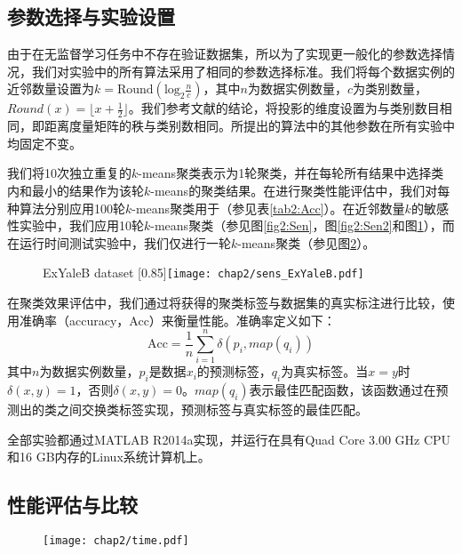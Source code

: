 \subsection{参数选择与实验设置}
由于在无监督学习任务中不存在验证数据集，所以为了实现更一般化的参数选择情况，我们对实验中的所有算法采用了相同的参数选择标准。我们将每个数据实例的近邻数量设置为$k = \mathrm{Round}(\mathrm{log}_2\frac{n}{c})$，其中$n$为数据实例数量，$c$为类别数量，$Round(x)=\lfloor x+\frac{1}{2}\rfloor$。我们参考文献\parencite{ng2002spectral}的结论，将投影的维度设置为与类别数目相同，即距离度量矩阵的秩与类别数相同。所提出的算法中的其他参数在所有实验中均固定不变。

我们将10次独立重复的$k$-means聚类表示为1轮聚类，并在每轮所有结果中选择类内和最小的结果作为该轮$k$-means的聚类结果。在进行聚类性能评估中，我们对每种算法分别应用100轮$k$-means聚类用于（参见表\ref{tab2:Acc}）。在近邻数量$k$的敏感性实验中，我们应用10轮$k$-means聚类（参见图\ref{fig2:Sen}，图\ref{fig2:Sen2}和图\ref{fig2:Sen3}），而在运行时间测试实验中，我们仅进行一轮$k$-means聚类（参见图\ref{fig2:Time}）。


\begin{figure}[t]
	\centering
					{ExYaleB dataset}
					[0.85\textwidth]{\texttt{[image: chap2/sens\_ExYaleB.pdf]}}
	\label{fig2:Sen3}
\end{figure} 
在聚类效果评估中，我们通过将获得的聚类标签与数据集的真实标注进行比较，使用准确率（accuracy，Acc）来衡量性能。准确率定义如下：
\begin{equation}
	\mathrm{Acc} = \frac{1}{n}\sum^{n}_{i=1}\delta(p_i, map(q_i))
\end{equation}
其中$n$为数据实例数量，$p_i$是数据$x_i$的预测标签，$q_i$为真实标签。当$x=y$时$\delta(x, y) = 1$，否则$\delta(x,y) = 0$。$map(q_i)$表示最佳匹配函数，该函数通过在预测出的类之间交换类标签实现，预测标签与真实标签的最佳匹配。

全部实验都通过MATLAB R2014a实现，并运行在具有Quad Core 3.00 GHz CPU和16 GB内存的Linux系统计算机上。

\subsection{性能评估与比较}
\begin{figure}[t]
	\centering
	\texttt{[image: chap2/time.pdf]}
	\label{fig2:Time}
\end{figure}

